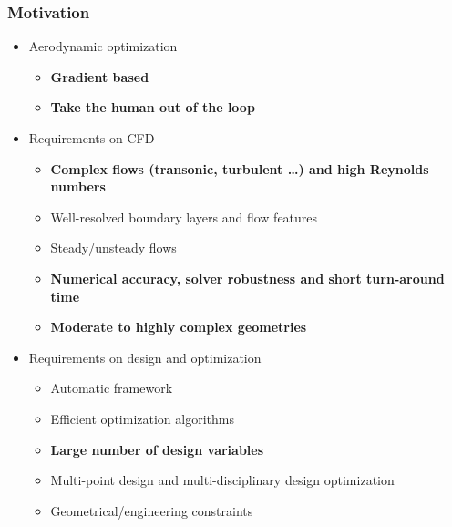 
\begin{frame}
  \frametitle{Motivation}
  \begin{itemize}
    \item Aerodynamic optimization
     \begin{itemize}
       \item \textbf<2>{Gradient based}
       \item \textbf<2>{Take the human out of the loop}
     \end{itemize}
    \item Requirements on CFD
      \begin{itemize}
      \item \textbf<3>{Complex flows (transonic, turbulent \dots) and high Reynolds numbers}
      \item Well-resolved boundary layers and flow features
      \item Steady/unsteady flows
      \item \textbf<4>{Numerical accuracy, solver robustness and short turn-around time}
      \item \textbf<3>{Moderate to highly complex geometries}
      \end{itemize}
    \item Requirements on design and optimization 
      \begin{itemize}
      \item Automatic framework
      \item Efficient optimization algorithms
      \item \textbf<3>{Large number of design variables}
      \item Multi-point design and multi-disciplinary design optimization
      \item Geometrical/engineering constraints 
      \end{itemize}
   \end{itemize}
   \\
\end{frame}



